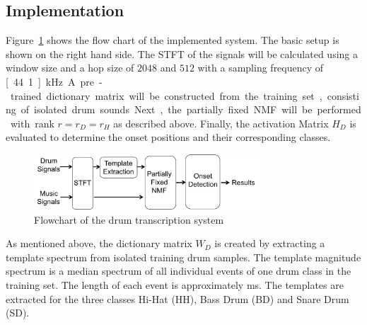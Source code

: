 \documentclass{article}
\newcommand{\figref}[1]{\mbox{Figure~\ref{#1}}}
\begin{document}
\subsection{Implementation}\label{subsec:processing steps}

\figref{fig:flowchart} shows the flow chart of the implemented system. The basic setup is shown on the right hand side. 
The STFT of the signals will be calculated using a window size and a hop size of $2048$ and $512$ with a sampling frequency of \unit[44.1]{kHz}. 
A pre-trained dictionary matrix will be constructed from the training set, consisting of isolated drum sounds. 
Next, the partially fixed NMF will be performed with rank $r = r_D = r_H$ as described above. 
Finally, the activation Matrix $H_D$ is evaluated to determine the onset positions and their corresponding classes.  

\begin{figure}
 \centerline{%
 \includegraphics[width=8.5cm]{flowchart.png}}%
 \caption{Flowchart of the drum transcription system} %
 \label{fig:flowchart}
\end{figure}

As mentioned above, the dictionary matrix $W_D$ is created by extracting a template spectrum from isolated training drum samples. The template magnitude spectrum is a median spectrum of all individual events of one drum class in the training set. The length of each event  is approximately \unit[80]{ms}. The templates are extracted for the three classes Hi-Hat (HH), Bass Drum (BD) and Snare Drum (SD).   
\end{document}
